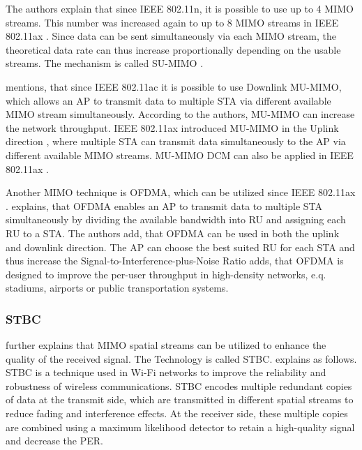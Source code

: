 The authors explain that since IEEE 802.11n, it is possible to use up to \num{4} MIMO streams.
This number was increased again to up to \num{8} MIMO streams in IEEE 802.11ax \cite{noauthor_ieee_2021}.
Since data can be sent simultaneously via each MIMO stream,
the theoretical data rate can thus increase proportionally depending on the usable streams.
The mechanism is called \ac{SU}-\ac{MIMO} \cite{noauthor_ieee_2021}.

\textcite{sauter_wireless_2022} mentions, that since IEEE 802.11ac it is possible to use Downlink \ac{MU}-\ac{MIMO},
which allows an \ac{AP} to transmit data to multiple \ac{STA} via different available \ac{MIMO} stream simultaneously.
According to the authors, \ac{MU}-\ac{MIMO} can increase the network throughput.
IEEE 802.11ax introduced \ac{MU}-\ac{MIMO} in the Uplink direction \cite{noauthor_ieee_2021}, where multiple \ac{STA} can transmit data simultaneously to the \ac{AP} via different available \ac{MIMO} streams.
MU-\ac{MIMO} DCM can also be applied in IEEE 802.11ax \cite{noauthor_ieee_2021}.

Another \ac{MIMO} technique is \ac{OFDMA}, which can be utilized since IEEE 802.11ax \cite{noauthor_ieee_2021, avallone_will_2021, omar_survey_2016}.
\textcite{avallone_will_2021} explains, that \ac{OFDMA} enables an \ac{AP} to transmit data to multiple \ac{STA} simultaneously by dividing the available bandwidth into \ac{RU} and assigning each \ac{RU} to a \ac{STA}.
The authors add, that \ac{OFDMA} can be used in both the uplink and downlink direction.
The \ac{AP} can choose the best suited \ac{RU} for each \ac{STA} and thus increase the Signal-to-Interference-plus-Noise Ratio \cite{khorov_tutorial_2019}
\textcite{behara_performance_2022} adds, that \ac{OFDMA} is designed to improve the per-user throughput in high-density networks, e.q.
stadiums, airports or public transportation systems.

\subsubsection*{\acf{STBC}}
\textcite{abbas_efficient_2016} further explains that \ac{MIMO} spatial streams can be utilized to enhance the
quality of the received signal.
The Technology is called \ac{STBC}.
\textcite{santumon_space-time_2012} explains as follows.
\ac{STBC} is a technique used in Wi-Fi networks to improve the reliability and robustness of wireless communications.
\ac{STBC} encodes multiple redundant copies of data at the transmit side, which are transmitted in different spatial streams to
reduce fading and interference effects.
At the receiver side, these multiple copies are combined using a maximum likelihood detector
to retain a high-quality signal and decrease the \ac{PER}.


